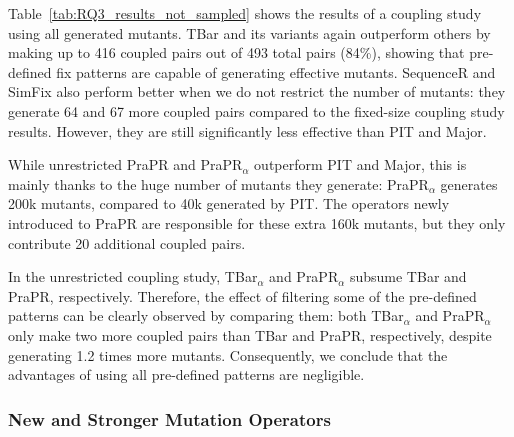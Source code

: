 \documentclass[conference]{IEEEtran}
\begin{document}

Table~\ref{tab:RQ3_results_not_sampled} shows the results of a coupling study
using all generated mutants. TBar and its variants again outperform others by
making up to 416 coupled pairs out of 493 total pairs (84\%), showing that
pre-defined fix patterns are capable of generating effective mutants. SequenceR
and SimFix also perform better when we do not restrict the number of mutants:
they generate 64 and 67 more coupled pairs compared to the fixed-size coupling
study results. However, they are still significantly less effective than PIT and
Major.

While unrestricted PraPR and PraPR$_{\alpha}$ outperform PIT and Major, this is 
mainly thanks to the huge number of mutants they generate: PraPR$_{\alpha}$ 
generates 200k mutants, compared to 40k generated by PIT. The operators newly 
introduced to PraPR are responsible for these extra 160k mutants, but they only 
contribute 20 additional coupled pairs.

In the unrestricted coupling study, TBar$_{\alpha}$ and PraPR$_{\alpha}$ subsume
TBar and PraPR, respectively. Therefore, the effect of filtering some of the
pre-defined patterns can be clearly observed by comparing them: both
TBar$_{\alpha}$ and PraPR$_{\alpha}$ only make two more coupled pairs than TBar
and PraPR, respectively, despite generating 1.2 times more mutants.
Consequently, we conclude that the advantages of using all pre-defined patterns
are negligible.



\subsubsection{New and Stronger Mutation Operators}
\end{document}
